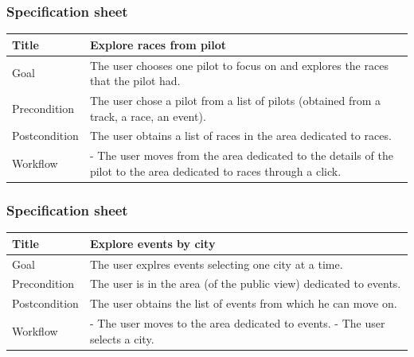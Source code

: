 \documentclass{beamer}
\begin{document}
\begin{frame}
    \frametitle{Specification sheet}
    \begin{table}
        \tiny
        \begin{tabular}{|p{2cm}|p{6cm}|}
        \hline
        Title & \textbf{Explore races from pilot} \\
        \hline
        Goal & The user chooses one pilot to focus on and explores the races that the pilot had. \\
        \hline
        Precondition & The user chose a pilot from a list of pilots (obtained from a track, a race, an event).\\
        \hline
        Postcondition & The user obtains a list of races in the area dedicated to races. \\
        \hline
        Workflow &
        - The user moves from the area dedicated to the details of the pilot to the
        area dedicated to races through a click. \\
        \hline
        \end{tabular}
\end{table}
\end{frame}


\begin{frame}
    \frametitle{Specification sheet}
    \begin{table}
        \tiny
        \begin{tabular}{|p{2cm}|p{6cm}|}
        \hline
        Title & \textbf{Explore events by city} \\
        \hline
        Goal & The user explres events selecting one city at a time. \\
        \hline
        Precondition & The user is in the area (of the public view) dedicated to events.\\
        \hline
        Postcondition & The user obtains the list of events from which he can move on.\\
        \hline
        Workflow &
        - The user moves to the area dedicated to events. \newline
        - The user selects a city. \\
        \hline
        \end{tabular}
\end{table}
\end{frame}
\end{document}
